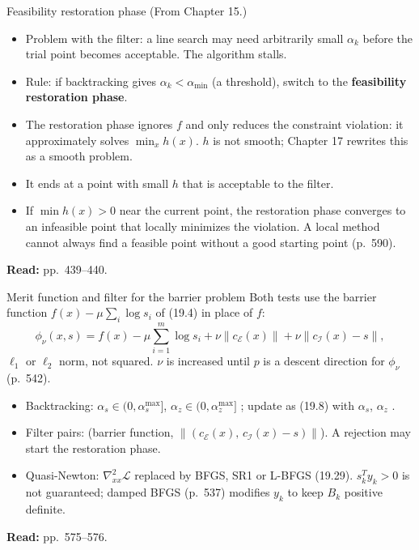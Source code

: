 \documentclass[aspectratio=169,12pt]{beamer}
\newcommand{\eqn}[1]{\text{\small(#1)}}
\newcommand{\readbook}[1]{{\color{red}\textbf{Read:} #1}}
\newcommand{\cE}{\mathcal{E}}
\newcommand{\cI}{\mathcal{I}}
\newcommand{\cL}{\mathcal{L}}
\newcommand{\hessL}{\nabla_{xx}^{2}\cL}
\newcommand{\from}[1]{{\small(From #1.)}}
\begin{document}
\begin{frame}{Feasibility restoration phase \from{Chapter 15}}
  \begin{itemize}\setlength\itemsep{0.4em}
    \item Problem with the filter: a line search may need arbitrarily small $\alpha_{k}$ before the trial point
      becomes acceptable. The algorithm stalls.
    \item Rule: if backtracking gives $\alpha_{k}<\alpha_{\min}$ (a threshold), switch to the
      \textbf{feasibility restoration phase}.
    \item The restoration phase ignores $f$ and only reduces the constraint violation:
      it approximately solves $\min_{x}h(x)$. $h$ is not smooth; Chapter 17 rewrites this as a smooth problem.
    \item It ends at a point with small $h$ that is acceptable to the filter.
    \item If $\min h(x)>0$ near the current point, the restoration phase converges to an infeasible point
      that locally minimizes the violation. A local method cannot always find a feasible point
      without a good starting point (p.~590).
  \end{itemize}
  \readbook{pp.~439--440.}
\end{frame}

\begin{frame}{Merit function and filter for the barrier problem}
  Both tests use the barrier function $f(x)-\mu\sum_{i}\log s_{i}$ of (19.4) in place of $f$:
  \[ \phi_{\nu}(x,s)=f(x)-\mu\sum_{i=1}^{m}\log s_{i}+\nu\|c_{\cE}(x)\|+\nu\|c_{\cI}(x)-s\| , \tag{19.26} \]
  $\ell_{1}$ or $\ell_{2}$ norm, not squared. $\nu$ is increased until $p$ is a descent direction for $\phi_{\nu}$ (p.~542).
  \begin{itemize}\setlength\itemsep{0.05em}
    \item Backtracking: $\alpha_{s}\in(0,\alpha_{s}^{\max}]$, $\alpha_{z}\in(0,\alpha_{z}^{\max}]$ \eqn{19.27};
      update as (19.8) with $\alpha_{s}$, $\alpha_{z}$ \eqn{19.28}.
    \item Filter pairs: (barrier function, $\|(c_{\cE}(x),\,c_{\cI}(x)-s)\|$). A rejection may start the restoration phase.
    \item Quasi-Newton: $\hessL$ replaced by BFGS, SR1 or L-BFGS (19.29). $s_{k}^{T}y_{k}>0$ is not guaranteed;
      damped BFGS (p.~537) modifies $y_{k}$ to keep $B_{k}$ positive definite.
  \end{itemize}
  \readbook{pp.~575--576.}
\end{frame}
\end{document}
